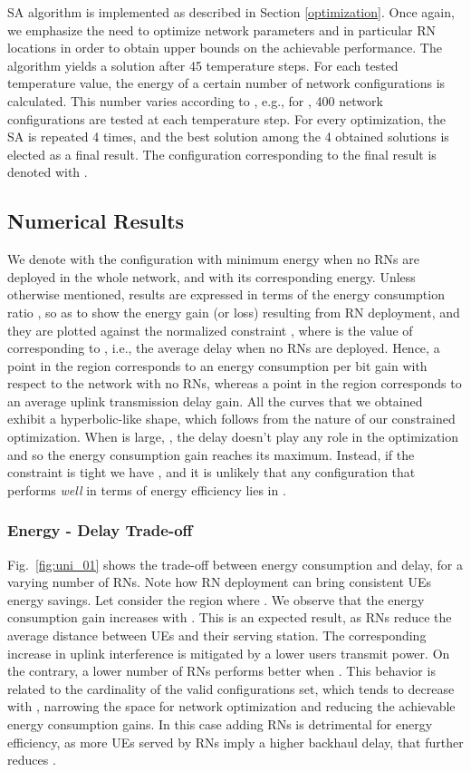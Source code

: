 \documentclass[draftcls,onecolumn]{IEEEtran}
\theoremstyle{plain}
\theoremstyle{definition}
\begin{document}
SA algorithm is implemented as described in Section \ref{optimization}. Once again, we emphasize the need to optimize network parameters and in particular RN locations in order to obtain upper bounds on the achievable performance. The algorithm yields a solution after 45 temperature steps. For each tested temperature value, the energy of a certain number of network configurations is calculated. This number varies according to , e.g., for , 400 network configurations are tested at each temperature step. 
For every optimization, the SA is repeated 4 times, and the best solution among the 4 obtained solutions is elected as a final result. The configuration corresponding to the final result is denoted with . 

\subsection{Numerical Results}
We denote with  the configuration with minimum energy when no RNs are deployed in the whole network, and with  its corresponding energy. 
Unless otherwise mentioned, results are expressed in terms of the energy consumption ratio , so as to show the energy gain (or loss) resulting from RN deployment, and they are plotted against the normalized constraint , where  is the value of  corresponding to , i.e., the average delay when no RNs are deployed. 
Hence, a point in the region  corresponds to an energy consumption per bit gain with respect to the network with no RNs, whereas a point in the region  corresponds to an average uplink transmission delay gain. All the curves that we obtained exhibit a hyperbolic-like shape, which follows from the nature of our constrained optimization. When  is large, , the delay doesn't play any role in the optimization and so the energy consumption gain reaches its maximum. 
Instead, if the constraint is tight we have , and it is unlikely that any configuration that performs {\it well} in terms of energy efficiency lies in . 


\subsubsection{Energy - Delay Trade-off}
Fig.~\ref{fig:uni_01} shows the trade-off between energy consumption and delay, for a varying number of RNs. Note how RN deployment can bring consistent UEs energy savings.
Let consider the region where . We observe that the energy consumption gain increases with . 
This is an expected result, as RNs reduce the average distance between UEs and their serving station. The corresponding increase in uplink interference is mitigated by a lower users transmit power. On the contrary, a lower number of RNs performs better when . This behavior is related to the cardinality  of the valid configurations set, which tends to decrease with , narrowing the space for network optimization and reducing the achievable energy consumption gains. In this case adding RNs is detrimental for energy efficiency, as more UEs served by RNs imply a higher backhaul delay, that further reduces .  
\end{document}
